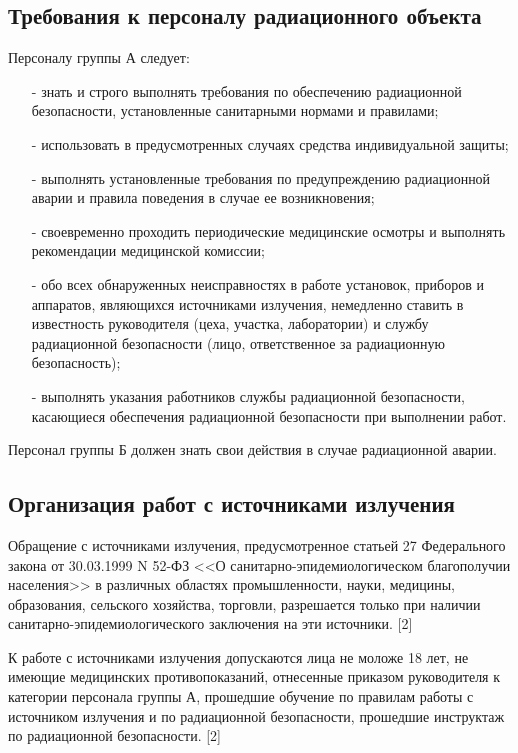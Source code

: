 \subsection{Требования к персоналу радиационного объекта} 
\label{subsect1_1_3}
	Персоналу группы А следует:
	\begin{itemize}
		\item[-] знать и строго выполнять требования по обеспечению радиационной 
			безопасности, установленные санитарными нормами и правилами;
		\item[-] использовать в предусмотренных случаях средства индивидуальной 
			защиты;
		\item[-] выполнять установленные требования по предупреждению радиационной 
			аварии и правила поведения в случае ее возникновения;
		\item[-] своевременно проходить периодические медицинские осмотры и 
			выполнять рекомендации медицинской комиссии;
		\item[-] обо всех обнаруженных неисправностях в работе установок, приборов 
			и аппаратов, являющихся источниками излучения, немедленно ставить 
			в известность руководителя (цеха, участка, лаборатории) и службу 
			радиационной безопасности (лицо, ответственное за радиационную 
			безопасность);
		\item[-] выполнять указания работников службы радиационной безопасности, 
			касающиеся обеспечения радиационной безопасности при выполнении работ.
	\end{itemize}

	Персонал группы Б должен знать свои действия в случае радиационной аварии.

\subsection{Организация работ с источниками излучения} \label{subsect1_1_4}
	Обращение с источниками излучения, предусмотренное статьей 27 
	Федерального закона от 30.03.1999 N 52-ФЗ <<О санитарно-эпидемиологическом 
	благополучии населения>> в различных областях промышленности, науки, 
	медицины, образования, сельского хозяйства, торговли, разрешается только 
	при наличии санитарно-эпидемиологического заключения на эти источники. [2]

	К работе с источниками излучения допускаются лица не моложе 18 лет, не 
	имеющие медицинских противопоказаний, отнесенные приказом руководителя к 
	категории персонала группы А, прошедшие обучение по правилам работы с 
	источником излучения и по радиационной безопасности, прошедшие инструктаж 
	по радиационной безопасности. [2]

